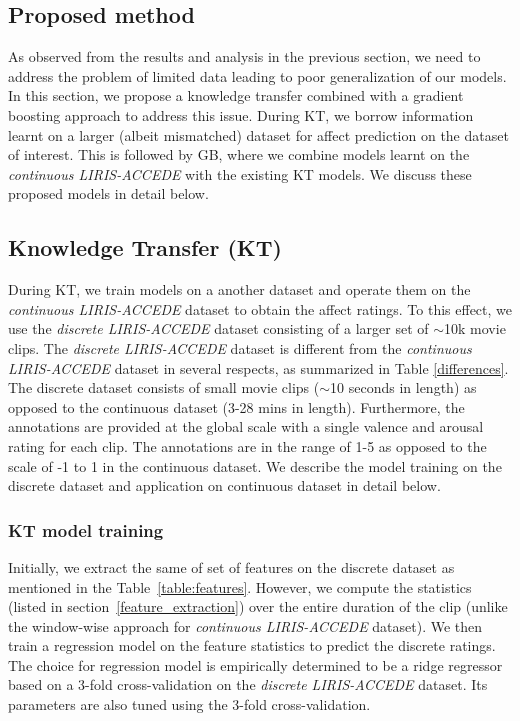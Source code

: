 \documentclass{article}
\begin{document}
\begin{spacing}{0.9}
\vspace{-2mm}
\subsection{Proposed method}
\vspace{-2mm}
As observed from the results and analysis in the previous section, we need to address the problem of limited data leading to poor generalization of our models.
In this section, we propose a knowledge transfer combined with a gradient boosting approach to address this issue.
During KT, we borrow information learnt on a larger (albeit mismatched) dataset for affect prediction on the dataset of interest.
This is followed by GB, where we combine models learnt on the {\it continuous LIRIS-ACCEDE} with the existing KT models.
We discuss these proposed models in detail below. 

\vspace{-2mm}
\subsection{Knowledge Transfer (KT)}
\vspace{-2mm}
During KT, we train models on a another dataset and operate them on the {\it continuous LIRIS-ACCEDE} dataset to obtain the affect ratings.
To this effect, we use the {\it discrete LIRIS-ACCEDE} dataset consisting of a larger set of $\sim$10k movie clips.  
The {\it discrete LIRIS-ACCEDE} dataset is different from the {\it continuous LIRIS-ACCEDE} dataset in several respects, as summarized in Table \ref{differences}.
The discrete dataset consists of small movie clips ($\sim$10 seconds in length) as opposed to the continuous dataset (3-28 mins in length).
Furthermore, the annotations are provided at the global scale with a single valence and arousal rating for each clip.
The annotations are in the range of 1-5 as opposed to the scale of -1 to 1 in the continuous dataset. 
We describe the model training on the discrete dataset and application on continuous dataset in detail below.

\vspace{-2mm}
\subsubsection{KT model training}
\vspace{-2mm}
Initially, we extract the same of set of features on the discrete dataset as mentioned in the Table~\ref{table:features}.
However, we compute the statistics (listed in section~\ref{feature_extraction}) over the entire duration of the clip (unlike the window-wise approach for {\it continuous LIRIS-ACCEDE} dataset).
We then train a regression model on the feature statistics to predict the discrete ratings.
The choice for regression model is empirically determined to be a ridge regressor based on a 3-fold cross-validation on the {\it discrete LIRIS-ACCEDE} dataset. Its parameters are also tuned using the 3-fold cross-validation. 



\end{spacing}
\end{document}

